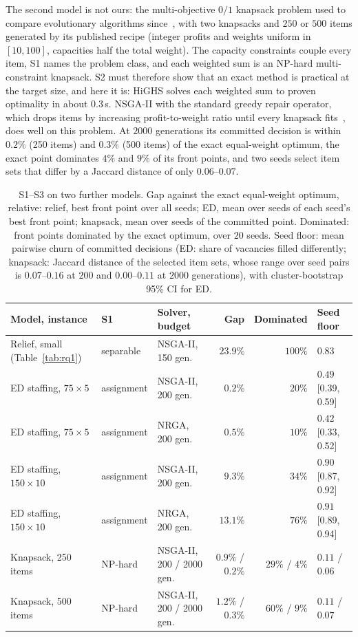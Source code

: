 \documentclass[systems,article,submit,moreauthors,pdftex]{Definitions/mdpi}
\begin{document}
The second model is not ours: the multi-objective $0/1$ knapsack problem used to compare
evolutionary algorithms since~\cite{zitzler1999spea}, with two knapsacks and $250$ or $500$
items generated by its published recipe (integer profits and weights uniform in $[10, 100]$,
capacities half the total weight). The capacity constraints couple every item, S1 names the
problem class, and each weighted sum is an NP-hard multi-constraint knapsack. S2 must therefore
show that an exact method is practical at the target size, and here it is: HiGHS solves each
weighted sum to proven optimality in about $0.3$\,s. NSGA-II with the standard greedy repair
operator, which drops items by increasing profit-to-weight ratio until every knapsack
fits~\cite{zitzler1999spea}, does well on this problem. At $2000$ generations its committed
decision is within $0.2\%$ (250 items) and $0.3\%$ (500 items) of the exact equal-weight optimum,
the exact point dominates $4\%$ and $9\%$ of its front points, and two seeds select item sets
that differ by a Jaccard distance of only $0.06$--$0.07$.

\begin{table}[H]
\centering
\caption{S1--S3 on two further models. Gap against the exact equal-weight optimum, relative:
relief, best front point over all seeds; ED, mean over seeds of each seed's best front point;
knapsack, mean over seeds of the committed point. Dominated: front points dominated by the exact
optimum, over $20$ seeds. Seed floor: mean pairwise churn of committed decisions (ED: share of
vacancies filled differently; knapsack: Jaccard distance of the selected item sets, whose
range over seed pairs is $0.07$--$0.16$ at $200$ and $0.00$--$0.11$ at $2000$ generations), with
cluster-bootstrap 95\% CI for ED.\label{tab:cases}}
\small
\begin{tabularx}{\textwidth}{>{\raggedright\arraybackslash}X l l r r l}
\toprule
Model, instance & S1 & Solver, budget & Gap & Dominated & Seed floor\\
\midrule
Relief, small (Table~\ref{tab:rq1}) & separable & NSGA-II, 150 gen. & $23.9\%$ & $100\%$ & $0.83$\\
ED staffing, $75\times5$ & assignment & NSGA-II, 200 gen. & $0.2\%$ & $20\%$ & $0.49$ [0.39, 0.59]\\
ED staffing, $75\times5$ & assignment & NRGA, 200 gen. & $0.5\%$ & $10\%$ & $0.42$ [0.33, 0.52]\\
ED staffing, $150\times10$ & assignment & NSGA-II, 200 gen. & $9.3\%$ & $34\%$ & $0.90$ [0.87, 0.92]\\
ED staffing, $150\times10$ & assignment & NRGA, 200 gen. & $13.1\%$ & $76\%$ & $0.91$ [0.89, 0.94]\\
Knapsack, 250 items & NP-hard & NSGA-II, 200 / 2000 gen. & $0.9\%$ / $0.2\%$ & $29\%$ / $4\%$ & $0.11$ / $0.06$\\
Knapsack, 500 items & NP-hard & NSGA-II, 200 / 2000 gen. & $1.2\%$ / $0.3\%$ & $60\%$ / $9\%$ & $0.11$ / $0.07$\\
\bottomrule
\end{tabularx}
\end{table}
\end{document}
